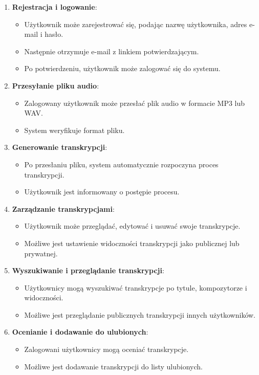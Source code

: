 \documentclass[a4paper,twoside,12pt]{book}
\begin{document}
\begin{enumerate}
    \item \textbf{Rejestracja i logowanie}:
          \begin{itemize}
            \item Użytkownik może zarejestrować się, podając nazwę użytkownika, adres e-mail i hasło.
            \item Następnie otrzymuje e-mail z linkiem potwierdzającym.
            \item Po potwierdzeniu, użytkownik może zalogować się do systemu.
          \end{itemize}
          
    \item \textbf{Przesyłanie pliku audio}:
          \begin{itemize}
            \item Zalogowany użytkownik może przesłać plik audio w formacie MP3 lub WAV.
            \item System weryfikuje format pliku.
          \end{itemize}
          
    \item \textbf{Generowanie transkrypcji}:
          \begin{itemize}
            \item Po przesłaniu pliku, system automatycznie rozpoczyna proces transkrypcji.
            \item Użytkownik jest informowany o postępie procesu.
          \end{itemize}
          
    \item \textbf{Zarządzanie transkrypcjami}:
          \begin{itemize}
            \item Użytkownik może przeglądać, edytować i usuwać swoje transkrypcje.
            \item Możliwe jest ustawienie widoczności transkrypcji jako publicznej lub prywatnej.
          \end{itemize}
          
    \item \textbf{Wyszukiwanie i przeglądanie transkrypcji}:
          \begin{itemize}
            \item Użytkownicy mogą wyszukiwać transkrypcje po tytule, kompozytorze i widoczności.
            \item Możliwe jest przeglądanie publicznych transkrypcji innych użytkowników.
          \end{itemize}
          
    \item \textbf{Ocenianie i dodawanie do ulubionych}:
          \begin{itemize}
            \item Zalogowani użytkownicy mogą oceniać transkrypcje.
            \item Możliwe jest dodawanie transkrypcji do listy ulubionych.
          \end{itemize}
\end{enumerate}
\end{document}
